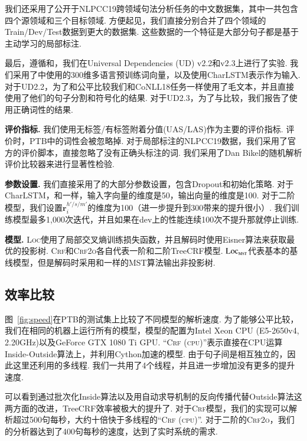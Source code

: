 我们还采用了公开于NLPCC19跨领域句法分析任务的中文数据集\cite{peng-etal-2019-overview}，其中一共包含四个源领域和三个目标领域.
方便起见，我们直接分别合并了四个领域的Train/Dev/Test数据到更大的数据集.
这些数据的一个特征是大部分句子都是基于主动学习的局部标注.

最后，遵循\cite{ji-etal-2019-graph}和\cite{zhang-etal-2019-empirical}，我们在Universal Dependencies (UD) v2.2和v2.3上进行了实验.
我们采用了\cite{zeman-etal-2018-conll}中使用的300维多语言预训练词向量，以及使用CharLSTM表示作为输入.
对于UD2.2，为了和\cite{ji-etal-2019-graph}公平比较我们和CoNLL18任务一样\cite{zeman-etal-2018-conll}使用了毛文本，并且直接使用了他们的句子分割和符号化的结果.
对于UD2.3，为了与\cite{zhang-etal-2019-empirical}比较，我们报告了使用正确词性的结果.



\noindent\textbf{评价指标.}
我们使用无标签/有标签附着分值(UAS/LAS)作为主要的评价指标.
评价时，PTB中的词性会被忽略掉.
对于局部标注的NLPCC19数据，我们采用了官方的评价脚本，直接忽略了没有正确头标注的词.
我们采用了Dan Bikel的随机解析评价比较器来进行显著性检验.

\noindent\textbf{参数设置.}
我们直接采用了\cite{dozat-etal-2017-biaffine}的大部分参数设置，包含Dropout和初始化策略.
对于CharLSTM，和\cite{lample-etal-2016-neural}一样，输入字向量的维度是50，输出向量的维度是100.
对于二阶模型，我们设置$\mathbf{r}^{h'/s/m'}_i$的维度为100（进一步提升到300带来的提升很小）.
我们训练模型最多1,000次迭代，并且如果在dev上的性能连续100次不提升那就停止训练.

\noindent\textbf{模型.}
\textsc{Loc}使用了局部交叉熵训练损失函数，并且解码时使用Eisner算法来获取最优的投影树.
\textsc{Crf}和\textsc{Crf2o}各自代表一阶和二阶TreeCRF模型.
$\textsc{Loc}_{\textsc{mst}}$代表基本的基线模型，但是解码时采用和\cite{dozat-etal-2017-biaffine}一样的MST算法输出非投影树.

\subsection{效率比较}

图~\ref{fig:speed}在PTB的测试集上比较了不同模型的解析速度.
为了能够公平比较，我们在相同的机器上运行所有的模型，模型的配置为Intel Xeon CPU (E5-2650v4, 2.20GHz)以及GeForce GTX 1080 Ti GPU.
``\textsc{Crf (cpu)}''表示直接在CPU运算Inside-Outside算法上，并利用Cython加速的模型.
由于句子间是相互独立的，因此这里还利用的多线程.
我们一共用了4个线程，并且进一步增加没有更多的提升速度.

可以看到通过批次化Inside算法以及用自动求导机制的反向传播代替Outside算法这两方面的改进，TreeCRF效率被极大的提升了.
对于\textsc{Crf}模型，我们的实现可以解析超过500句每秒，大约十倍快于多线程的``\textsc{Crf (cpu)}''.
对于二阶的\textsc{Crf2o}，我们的分析器达到了400句每秒的速度，达到了实时系统的需求.

